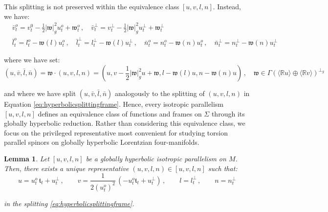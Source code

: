 \documentclass[10pt,reqno,a4paper]{amsart}
\theoremstyle{plain}
\newtheorem{lemma}[thm]{Lemma}
\theoremstyle{definition}
\theoremstyle{remark}
\theoremstyle{remark}
\def\frw{\mathfrak{w}}
\renewcommand{\(}{ (}
\renewcommand{\)}{ )}
\begin{document}
\noindent
This splitting is not preserved within the equivalence class $[u,v,l,n]$. Instead, we have:
\begin{eqnarray*}
& \bar{v}^o_t = v^0_t -\frac{1}{2} \vert \frw\vert^2_g u^o_t + \frw^o_t\, , \quad \bar{v}^{\perp}_t = v^{\perp}_t - \frac{1}{2} \vert \frw\vert^2_g u^{\perp}_t + \frw^{\perp}_t\\
& \bar{l}_t^{o} = l^o_t - \frw(l) u^o_t\, , \quad  \bar{l}_t^{\perp} = l^{\perp}_t - \frw (l) u^{\perp}_t\, , \quad \bar{n}_t^{o} = n^o_t - \frw(n) u^o_t\, , \quad  \bar{n}_t^{\perp} = n^{\perp}_t - \frw (n) u^{\perp}_t
\end{eqnarray*}

\noindent
where we have set:
\begin{equation}
\label{eq:parametrizedw}
(u,\bar{v},\bar{l},\bar{n}) = \mathfrak{w}\cdot (u,v,l,n)  = (u,v-\frac{1}{2} \vert \frw\vert^2_g u + \frw,l - \frw (l) u,n - \frw (n) u)\, , \quad \frw\in \Gamma (\langle \mathbb{R} u\rangle \oplus \langle \mathbb{R} v\rangle)^{\perp_g}
\end{equation}
 
\noindent
and where we have split $(u,\bar{v},\bar{l},\bar{n})$ analogously to the splitting of $(u,v,l,n)$ in Equation \eqref{eq:hyperbolicsplittingframe}. Hence, every isotropic parallelism $[u,v,l,n]$ defines an equivalence class of functions and frames on $\Sigma$ through its globally hyperbolic reduction. Rather than considering this equivalence class, we focus on the privileged representative most convenient for studying torsion parallel spinors on globally hyperbolic Lorentzian four-manifolds. 

\begin{lemma}
\label{lemma:ghcoframe}
Let $[u,v,l,n]$ be a globally hyperbolic isotropic parallelism on $M$. Then, there exists a unique representative $(u,v,l,n)\in[u,v,l,n]$ such that:
\begin{equation*} 
u = u^o_t\, \mathfrak{t}_t + u^{\perp}_t\, , \qquad v = \frac{1}{2(u^o_t)^2}\,( -u^o_t \mathfrak{t}_t + u^{\perp}_t)  \, , \qquad l =   l^{\perp}_t \, , \qquad n = n^{\perp}_t 
\end{equation*}

\noindent
in the splitting \eqref{eq:hyperbolicsplittingframe}.
\end{lemma}
\end{document}
